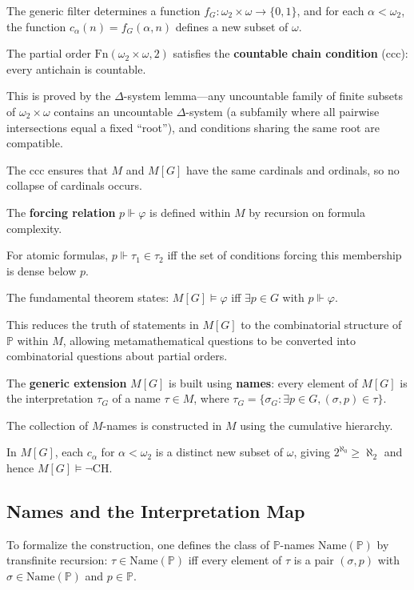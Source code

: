 The generic filter determines a function $f_G: \omega_2 \times \omega \to \{0,1\}$, and for each $\alpha < \omega_2$, the function $c_\alpha(n) = f_G(\alpha, n)$ defines a new subset of $\omega$.

The partial order $\text{Fn}(\omega_2 \times \omega, 2)$ satisfies the \textbf{countable chain condition} (ccc): every antichain is countable.

This is proved by the $\Delta$-system lemma---any uncountable family of finite subsets of $\omega_2 \times \omega$ contains an uncountable $\Delta$-system (a subfamily where all pairwise intersections equal a fixed ``root''), and conditions sharing the same root are compatible.

The ccc ensures that $M$ and $M[G]$ have the same cardinals and ordinals, so no collapse of cardinals occurs.

The \textbf{forcing relation} $p \Vdash \varphi$ is defined within $M$ by recursion on formula complexity.

For atomic formulas, $p \Vdash \tau_1 \in \tau_2$ iff the set of conditions forcing this membership is dense below $p$.

The fundamental theorem states: $M[G] \models \varphi$ iff $\exists p \in G$ with $p \Vdash \varphi$.

This reduces the truth of statements in $M[G]$ to the combinatorial structure of $\mathbb{P}$ within $M$, allowing metamathematical questions to be converted into combinatorial questions about partial orders.

The \textbf{generic extension} $M[G]$ is built using \textbf{names}: every element of $M[G]$ is the interpretation $\tau_G$ of a name $\tau \in M$, where $\tau_G = \{\sigma_G : \exists p \in G, (\sigma, p) \in \tau\}$.

The collection of $M$-names is constructed in $M$ using the cumulative hierarchy.

In $M[G]$, each $c_\alpha$ for $\alpha < \omega_2$ is a distinct new subset of $\omega$, giving $2^{\aleph_0} \geq \aleph_2$ and hence $M[G] \models \neg\text{CH}$.

\subsection*{Names and the Interpretation Map}

To formalize the construction, one defines the class of $\mathbb{P}$-names $\text{Name}(\mathbb{P})$ by transfinite recursion: $\tau \in \text{Name}(\mathbb{P})$ iff every element of $\tau$ is a pair $(\sigma, p)$ with $\sigma \in \text{Name}(\mathbb{P})$ and $p \in \mathbb{P}$.

